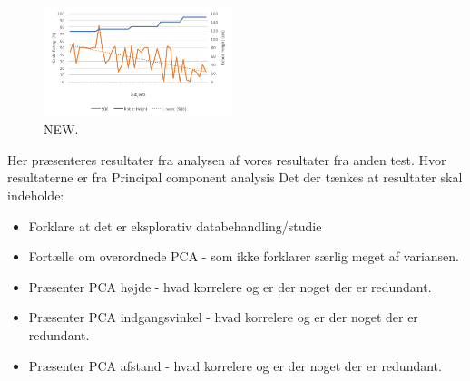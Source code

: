 \noindent
%
%
\begin{figure}[H]
	\centering
	\includegraphics[width = 0.49\textwidth]{Figure/HeightSQ6}
	\setlength{} 
	\caption{NEW.}
	\label{fig:HeightSQ6}
\end{figure}
\noindent
%


{\color{red} Her præsenteres resultater fra analysen af vores resultater fra anden test. Hvor resultaterne er fra Principal component analysis}
%
Det der tænkes at resultater skal indeholde: 
\begin{itemize}
	\item Forklare at det er eksplorativ databehandling/studie
	\item Fortælle om overordnede PCA - som ikke forklarer særlig meget af variansen.
	\item Præsenter PCA højde - hvad korrelere og er der noget der er redundant.
	\item Præsenter PCA indgangsvinkel - hvad korrelere og er der noget der er redundant.
	\item Præsenter PCA afstand - hvad korrelere og er der noget der er redundant.
\end{itemize}